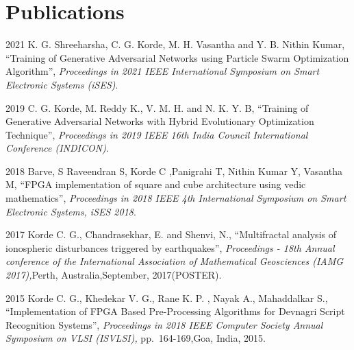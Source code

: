 \documentclass[fontsize=11pt]{tccv}
\begin{document}
\section{Publications}
\begin{publi}
\item{2021} {K. G. Shreeharsha, C. G. Korde, M. H. Vasantha and Y. B. Nithin Kumar, \textquotedblleft Training of Generative Adversarial Networks using Particle Swarm Optimization Algorithm\textquotedblright, \textit{Proceedings in 2021 IEEE International Symposium on Smart Electronic Systems (iSES)}.\qquad }
\item{2019} {C. G. Korde, M. Reddy K., V. M. H. and N. K. Y. B, \textquotedblleft Training of Generative Adversarial Networks with Hybrid Evolutionary Optimization Technique\textquotedblright, \textit{Proceedings in 2019 IEEE 16th India Council International Conference (INDICON)}.\qquad }
\item{2018} {Barve, S Raveendran S, Korde C ,Panigrahi T, Nithin Kumar Y, Vasantha M,  \textquotedblleft FPGA implementation of square and cube architecture using vedic mathematics\textquotedblright, \textit{Proceedings in 2018 IEEE 4th International Symposium on Smart Electronic Systems, iSES 2018}.\qquad }
\item{2017} {  Korde C. G., Chandrasekhar, E. and Shenvi, N., \textquotedblleft Multifractal analysis of ionospheric disturbances triggered by earthquakes\textquotedblright, \textit{Proceedings - 18th Annual conference of the International Association of Mathematical Geosciences (IAMG 2017),}Perth, Australia,September, 2017(POSTER).\qquad }
\item{2015} {Korde C. G., Khedekar V. G., Rane K. P. , Nayak A., Mahaddalkar S., \textquotedblleft Implementation of FPGA Based Pre-Processing Algorithms for Devnagri Script Recognition Systems\textquotedblright, \textit{Proceedings in 2018 IEEE Computer Society Annual Symposium on VLSI (ISVLSI),} pp.~164-169,Goa, India, 2015.\qquad }
\end{publi}

\vspace{2em}
\end{document}
